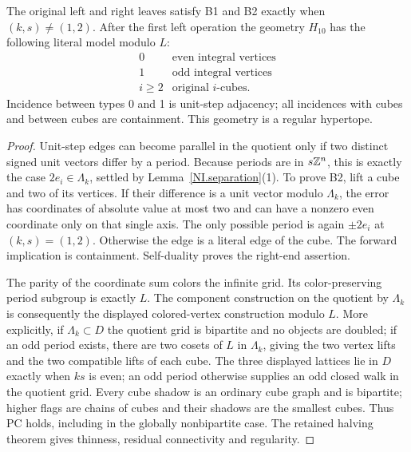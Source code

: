 \begin{proposition}\label{NI.first}
The original left and right leaves satisfy B1 and B2 exactly when
$(k,s)\ne(1,2)$. After the first left operation the geometry $H_{10}$
has the following literal model modulo $L$:
\[
\begin{array}{c|l}
0&\text{even integral vertices}\\
1&\text{odd integral vertices}\\
i\ge2&\text{original }i\text{-cubes}.
\end{array}
\]
Incidence between types 0 and 1 is unit-step adjacency; all incidences
with cubes and between cubes are containment. This geometry is a
regular hypertope.
\end{proposition}
\begin{proof}
Unit-step edges can become parallel in the quotient only if two
distinct signed unit vectors differ by a period. Because periods are
in $s\mathbb Z^n$, this is exactly the case $2e_i\in\Lambda_k$, settled
by Lemma~\ref{NI.separation}(1). To prove B2, lift a cube and two of its
vertices. If their difference is a unit vector modulo $\Lambda_k$,
the error has coordinates of absolute value at most two and can have
a nonzero even coordinate only on that single axis. The only possible
period is again $\pm2e_i$ at $(k,s)=(1,2)$. Otherwise the edge is a
literal edge of the cube. The forward implication is containment.
Self-duality proves the right-end assertion.

The parity of the coordinate sum colors the infinite grid. Its
color-preserving period subgroup is exactly $L$. The component
construction on the quotient by $\Lambda_k$ is consequently the
displayed colored-vertex construction modulo $L$. More explicitly,
if $\Lambda_k\subset D$ the quotient grid is bipartite and no
objects are doubled; if an odd period exists, there are two cosets
of $L$ in $\Lambda_k$, giving the two vertex lifts and the two
compatible lifts of each cube. The three displayed lattices lie in
$D$ exactly when $ks$ is even; an odd period otherwise supplies
an odd closed walk in the quotient grid. Every cube shadow is an ordinary
cube graph and is bipartite; higher flags are chains of cubes and
their shadows are the smallest cubes. Thus PC holds, including
in the globally nonbipartite case. The retained halving theorem
gives thinness, residual connectivity and regularity.
\end{proof}

